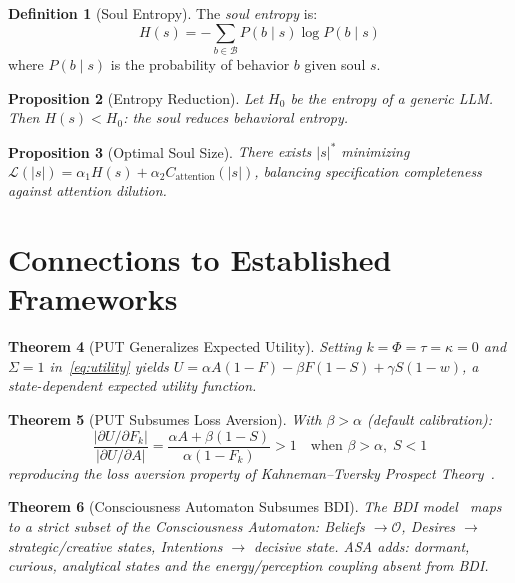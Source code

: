 \documentclass[12pt,a4paper]{article}
\theoremstyle{plain}
\newtheorem{theorem}{Theorem}[section]
\newtheorem{proposition}[theorem]{Proposition}
\theoremstyle{definition}
\newtheorem{definition}[theorem]{Definition}
\theoremstyle{remark}
\newcommand{\Fk}{F_k}
\begin{document}
\begin{definition}[Soul Entropy]
The \emph{soul entropy} is:
\[
H(s) = -\sum_{b \in \mathcal{B}} P(b \mid s) \log P(b \mid s)
\]
where $P(b \mid s)$ is the probability of behavior $b$ given soul $s$.
\end{definition}

\begin{proposition}[Entropy Reduction]
Let $H_0$ be the entropy of a generic LLM. Then $H(s) < H_0$: the soul reduces behavioral entropy.
\end{proposition}

\begin{proposition}[Optimal Soul Size]
There exists $|s|^*$ minimizing $\mathcal{L}(|s|) = \alpha_1 H(s) + \alpha_2 C_{\mathrm{attention}}(|s|)$, balancing specification completeness against attention dilution.
\end{proposition}

\section{Connections to Established Frameworks}

\begin{theorem}[PUT Generalizes Expected Utility]
Setting $k = \Phi = \tau = \kappa = 0$ and $\Sigma = 1$ in~\eqref{eq:utility} yields $U = \alpha A(1-F) - \beta F(1-S) + \gamma S(1-w)$, a state-dependent expected utility function.
\end{theorem}

\begin{theorem}[PUT Subsumes Loss Aversion]
With $\beta > \alpha$ (default calibration):
\[
\frac{|\partial U/\partial \Fk|}{|\partial U/\partial A|} = \frac{\alpha A + \beta(1-S)}{\alpha(1-\Fk)} > 1 \quad \text{when } \beta > \alpha,\; S < 1
\]
reproducing the loss aversion property of Kahneman--Tversky Prospect Theory~\cite{kahneman1979}.
\end{theorem}

\begin{theorem}[Consciousness Automaton Subsumes BDI]
The BDI model~\cite{rao1995} maps to a strict subset of the Consciousness Automaton: Beliefs $\to \mathcal{O}$, Desires $\to$ strategic/creative states, Intentions $\to$ decisive state. ASA adds: dormant, curious, analytical states and the energy/perception coupling absent from BDI.
\end{theorem}
\end{document}
